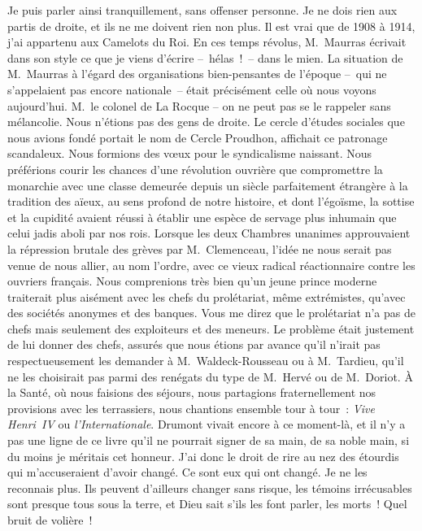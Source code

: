 \documentclass[french,twoside]{book} %
\begin{document}
\noindent Je puis parler ainsi tranquillement, sans offenser personne. Je ne dois rien aux partis de droite, et ils ne me doivent rien non plus. Il est vrai que de 1908 à 1914, j’ai appartenu aux Camelots du Roi. En ces temps révolus, M. Maurras écrivait dans son style ce que je viens d’écrire – hélas ! – dans le mien. La situation de M. Maurras à l’égard des organisations bien-pensantes de l’époque – qui ne s’appelaient pas encore nationale – était précisément celle où nous voyons aujourd’hui. M. le colonel de La Rocque – on ne peut pas se le rappeler sans mélancolie. Nous n’étions pas des gens de droite. Le cercle d’études sociales que nous avions fondé portait le nom de Cercle Proudhon, affichait ce patronage scandaleux. Nous formions des vœux pour le syndicalisme naissant. Nous préférions courir les chances d’une révolution ouvrière que compromettre la monarchie avec une classe demeurée depuis un siècle parfaitement étrangère à la tradition des aïeux, au sens profond de notre histoire, et dont l’égoïsme, la sottise et la cupidité avaient réussi à établir une espèce de servage plus inhumain que celui jadis aboli par nos rois. Lorsque les deux Chambres unanimes approuvaient la répression brutale des grèves par M. Clemenceau, l’idée ne nous serait pas venue de nous allier, au nom l’ordre, avec ce vieux radical réactionnaire contre les ouvriers français. Nous comprenions très bien qu’un jeune prince moderne traiterait plus aisément avec les chefs du prolétariat, même extrémistes, qu’avec des sociétés anonymes et des banques. Vous me direz que le prolétariat n’a pas de chefs mais seulement des exploiteurs et des meneurs. Le problème était justement de lui donner des chefs, assurés que nous étions par avance qu’il n’irait pas respectueusement les demander à M. Waldeck-Rousseau ou à M. Tardieu, qu’il ne les choisirait pas parmi des renégats du type de M. Hervé ou de M. Doriot. À la Santé, où nous faisions des séjours, nous partagions fraternellement nos provisions avec les terrassiers, nous chantions ensemble tour à tour : \emph{Vive Henri \textsc{IV}} ou \emph{l’Internationale}. Drumont vivait encore à ce moment-là, et il n’y a pas une ligne de ce livre qu’il ne pourrait signer de sa main, de sa noble main, si du moins je méritais cet honneur. J’ai donc le droit de rire au nez des étourdis qui m’accuseraient d’avoir changé. Ce sont eux qui ont changé. Je ne les reconnais plus. Ils peuvent d’ailleurs changer sans risque, les témoins irrécusables sont presque tous sous la terre, et Dieu sait s’ils les font parler, les morts ! Quel bruit de volière !\par
\end{document}
